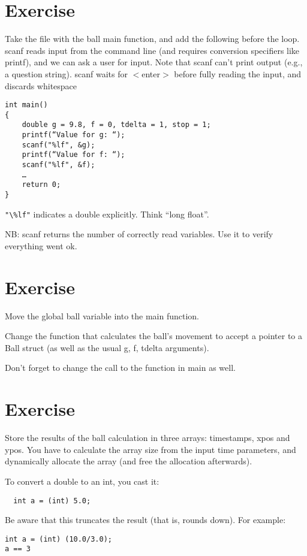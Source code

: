 \documentclass[a4paper]{article}
\begin{document}
\clearpage

\section{Exercise}

Take the file with the ball main function, and add the following before the loop. 
scanf reads input from the command line (and requires conversion specifiers like printf), and we can ask a user for input.
Note that scanf can’t print output (e.g., a question string). scanf waits for $<$enter$>$ before fully reading the input, and discards whitespace

\begin{lstlisting}
int main()
{
    double g = 9.8, f = 0, tdelta = 1, stop = 1;
    printf(“Value for g: “);
    scanf("%lf", &g);
    printf(“Value for f: “);
    scanf("%lf", &f);
    …
    return 0;
}
\end{lstlisting}

\lstinline|"\%lf"| indicates a double explicitly. Think “long float”.

NB: scanf returns the number of correctly read variables. Use it to verify everything went ok.

\section{Exercise}

Move the global ball variable into the main function. 

Change the function that calculates the ball’s movement to accept a pointer to a Ball struct (as well as the usual g, f, tdelta arguments).

Don’t forget to change the call to the function in main as well.

\section{Exercise}

Store the results of the ball calculation in three arrays: timestamps, xpos and ypos.
You have to calculate the array size from the input time parameters, and dynamically allocate the array (and free the allocation afterwards).

To convert a double to an int, you cast it: 
\begin{lstlisting}
  int a = (int) 5.0;
\end{lstlisting}

Be aware that this truncates the result (that is, rounds down). For example:
\begin{lstlisting}
int a = (int) (10.0/3.0);
a == 3
\end{lstlisting}
\end{document}
